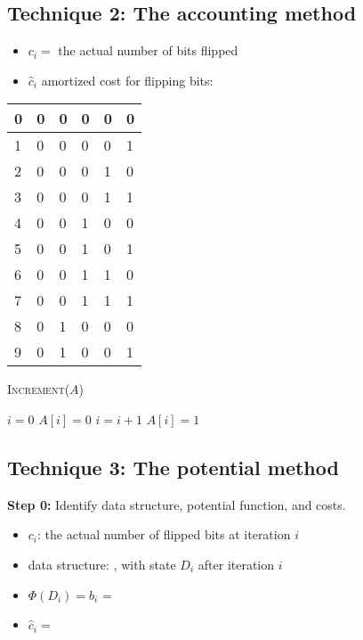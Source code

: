 \documentclass[11  pt]{article}
\begin{document}
\subsection{Technique 2: The accounting method}
\begin{itemize}
\item $c_i = $ the actual number of bits flipped
\item $\hat{c}_i$ amortized cost for flipping bits: 
\end{itemize}
{\Huge
\begin{tabular}{ l || p{1cm} | p{1cm} | p{1cm} | p{1cm} | p{1cm} |}
\hline
0& 	0 & 0 & 0 & 0 & 0\\
\hline 
1& 	0 & 0 & 0 & 0 & 1\\
\hline 
2& 	0 & 0 & 0 & 1 & 0\\
\hline 
3& 	0 & 0 & 0 & 1 & 1\\
\hline 
4& 	0 & 0 & 1 & 0 & 0\\
\hline 
5& 	0 & 0 & 1 & 0 & 1\\
\hline 
6& 	0 & 0 & 1 & 1 & 0\\
\hline 
7& 	0 & 0 & 1 & 1 & 1\\
\hline 
8& 	0 & 1 & 0 & 0 & 0\\
\hline 
9& 	0 & 1 & 0 & 0 & 1\\
\hline 
\end{tabular}
}
\begin{algorithm}
\textsc{Increment}($A$)
\begin{algorithmic}
\State $i = 0$
\State $A[i] = 0$
\State $i = i+1$
\EndWhile
{}
\State $A[i] = 1$
\EndIf
\end{algorithmic}
\end{algorithm}

\pagebreak
\subsection{Technique 3: The potential method}

\textbf{Step 0:} Identify data structure, potential function, and costs.
\begin{itemize}
\item $c_i$: the actual number of flipped bits at iteration $i$
\item data structure: , with state $D_i$ after iteration $i$
\item $\Phi(D_i) = b_i$ =  %
\item $\hat{c}_i = $ 
\end{itemize}
\end{document}
